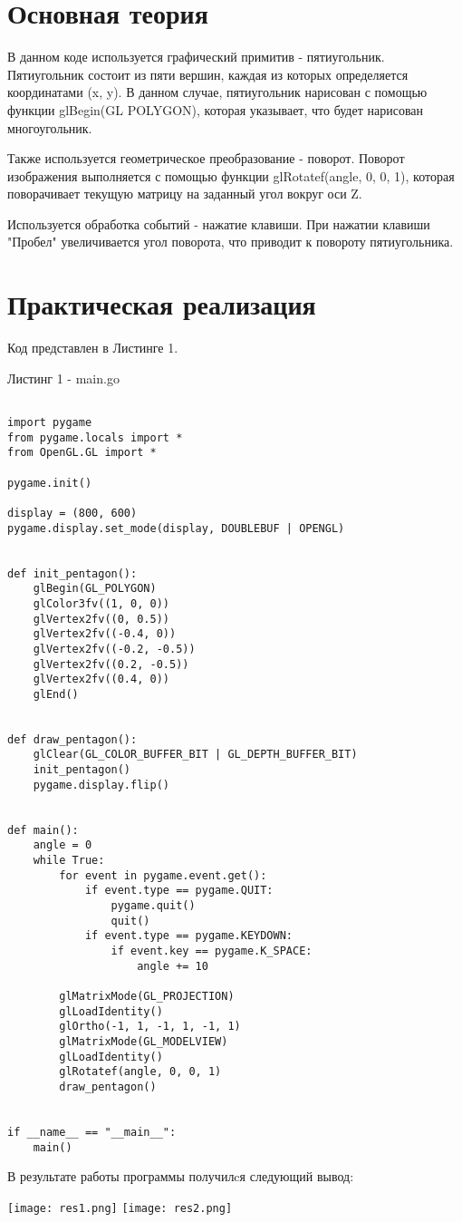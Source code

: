 \documentclass[a4paper, 14pt]{extarticle}
\begin{document}
\section{Основная теория}
\par
В данном коде используется графический примитив - пятиугольник. Пятиугольник состоит из пяти вершин, каждая из которых определяется координатами (x, y). В данном случае, пятиугольник нарисован с помощью функции glBegin(GL POLYGON), которая указывает, что будет нарисован многоугольник.
\par
Также используется геометрическое преобразование - поворот. Поворот изображения выполняется с помощью функции glRotatef(angle, 0, 0, 1), которая поворачивает текущую матрицу на заданный угол вокруг оси Z.
\par
Используется обработка событий - нажатие клавиши. При нажатии клавиши "Пробел" увеличивается угол поворота, что приводит к повороту пятиугольника.

\pagebreak
\section{Практическая реализация}
Код представлен в Листинге 1.
\par
\begin{center}
    Листинг 1 - main.go
\end{center}

\begin{lstlisting}

import pygame
from pygame.locals import *
from OpenGL.GL import *

pygame.init()

display = (800, 600)
pygame.display.set_mode(display, DOUBLEBUF | OPENGL)


def init_pentagon():
    glBegin(GL_POLYGON)
    glColor3fv((1, 0, 0))
    glVertex2fv((0, 0.5))
    glVertex2fv((-0.4, 0))
    glVertex2fv((-0.2, -0.5))
    glVertex2fv((0.2, -0.5))
    glVertex2fv((0.4, 0))
    glEnd()


def draw_pentagon():
    glClear(GL_COLOR_BUFFER_BIT | GL_DEPTH_BUFFER_BIT)
    init_pentagon()
    pygame.display.flip()


def main():
    angle = 0
    while True:
        for event in pygame.event.get():
            if event.type == pygame.QUIT:
                pygame.quit()
                quit()
            if event.type == pygame.KEYDOWN:
                if event.key == pygame.K_SPACE:
                    angle += 10

        glMatrixMode(GL_PROJECTION)
        glLoadIdentity()
        glOrtho(-1, 1, -1, 1, -1, 1)
        glMatrixMode(GL_MODELVIEW)
        glLoadIdentity()
        glRotatef(angle, 0, 0, 1)
        draw_pentagon()


if __name__ == "__main__":
    main()
\end{lstlisting}
В результате работы программы получилcя следующий вывод:
\begin{center}
    \texttt{[image: res1.png]}
    \texttt{[image: res2.png]}
\end{center}
\pagebreak
\end{document}
